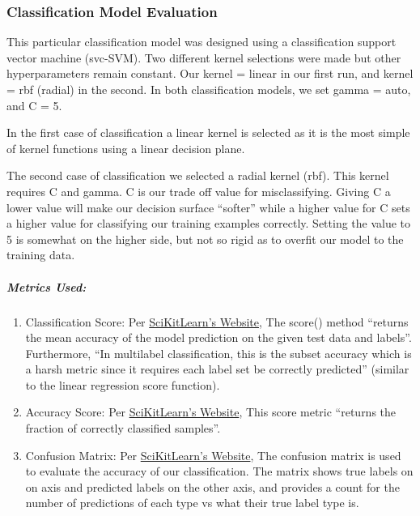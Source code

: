 \documentclass[11pt]{article}
\begin{document}
\hypertarget{classification-model-evaluation}{%
\subsubsection{Classification Model
Evaluation}\label{classification-model-evaluation}}

This particular classification model was designed using a classification
support vector machine (svc-SVM). Two different kernel selections were
made but other hyperparameters remain constant. Our kernel = linear in
our first run, and kernel = rbf (radial) in the second. In both
classification models, we set gamma = auto, and C = 5.

In the first case of classification a linear kernel is selected as it is
the most simple of kernel functions using a linear decision plane.

The second case of classification we selected a radial kernel (rbf).
This kernel requires C and gamma. C is our trade off value for
misclassifying. Giving C a lower value will make our decision surface
``softer'' while a higher value for C sets a higher value for
classifying our training examples correctly. Setting the value to 5 is
somewhat on the higher side, but not so rigid as to overfit our model to
the training data.

\hypertarget{metrics-used-2}{%
\subparagraph{Metrics Used:}\label{metrics-used-2}}

\begin{enumerate}
\def\labelenumi{\arabic{enumi}.}
\item
  Classification Score: Per
  \href{https://scikit-learn.org/stable/modules/generated/sklearn.svm.SVC.html\#sklearn.svm.SVC.score}{SciKitLearn's
  Website}, The score() method ``returns the mean accuracy of the model
  prediction on the given test data and labels''. Furthermore, ``In
  multilabel classification, this is the subset accuracy which is a
  harsh metric since it requires each label set be correctly predicted''
  (similar to the linear regression score function).
\item
  Accuracy Score: Per
  \href{https://scikit-learn.org/stable/modules/generated/sklearn.metrics.accuracy_score.html\#sklearn.metrics.accuracy_score}{SciKitLearn's
  Website}, This score metric ``returns the fraction of correctly
  classified samples''.
\item
  Confusion Matrix: Per
  \href{https://scikit-learn.org/stable/modules/generated/sklearn.metrics.confusion_matrix.html\#sklearn.metrics.confusion_matrix}{SciKitLearn's
  Website}, The confusion matrix is used to evaluate the accuracy of our
  classification. The matrix shows true labels on on axis and predicted
  labels on the other axis, and provides a count for the number of
  predictions of each type vs what their true label type is.
\end{enumerate}
\end{document}
